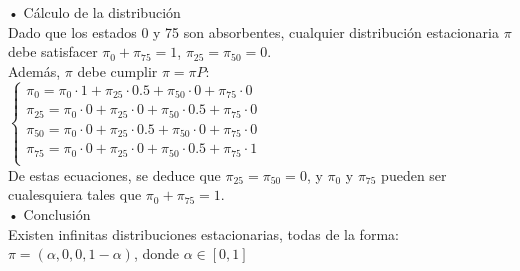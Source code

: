 \documentclass[a4paper, 12pt]{article}
\begin{document}
\begin{enumerate}
{                • Cálculo de la distribución \\
                Dado que los estados 0 y 75 son absorbentes, cualquier distribución estacionaria $\pi$ debe satisfacer $\pi_{0} + \pi_{75} = 1$, $\pi_{25} = \pi_{50} = 0$. \\
                Además, $\pi$ debe cumplir $\pi = \pi P$: \\
                \(
                    \begin{cases}
                        \pi_{0} = \pi_{0} \cdot 1 + \pi_{25} \cdot 0{.}5 + \pi_{50} \cdot 0 + \pi_{75} \cdot 0      \\
                        \pi_{25} = \pi_{0} \cdot 0 + \pi_{25} \cdot 0 + \pi_{50} \cdot 0{.}5 + \pi_{75} \cdot 0     \\
                        \pi_{50} = \pi_{0} \cdot 0 + \pi_{25} \cdot 0{.}5 + \pi_{50} \cdot 0 + \pi_{75} \cdot 0     \\
                        \pi_{75} = \pi_{0} \cdot 0 + \pi_{25} \cdot 0 + \pi_{50} \cdot 0{.}5 + \pi_{75} \cdot 1     \\
                    \end{cases}
                \) \\
                De estas ecuaciones, se deduce que $\pi_{25} = \pi_{50} = 0$, y $\pi_{0}$ y $\pi_{75}$ pueden ser cualesquiera tales que $\pi_{0} + \pi_{75} = 1$. \\

                • Conclusión \\
                Existen infinitas distribuciones estacionarias, todas de la forma: $\pi = (\alpha, 0, 0, 1 - \alpha)$, donde $\alpha \in [0, 1]$
            }


\end{enumerate}
\end{document}
